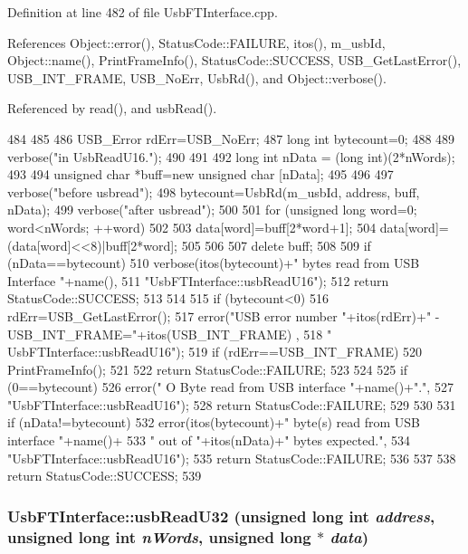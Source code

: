 Definition at line 482 of file UsbFTInterface.cpp.

References Object::error(), StatusCode::FAILURE, itos(), m\_\-usbId, Object::name(), PrintFrameInfo(), StatusCode::SUCCESS, USB\_\-GetLastError(), USB\_\-INT\_\-FRAME, USB\_\-NoErr, UsbRd(), and Object::verbose().

Referenced by read(), and usbRead().


\begin{DoxyCode}
484                                                                {
485   
486   USB_Error rdErr=USB_NoErr;
487   long int bytecount=0;
488 
489     verbose("in UsbReadU16.");
490 
491 
492   long int nData = (long int)(2*nWords);
493   
494   unsigned char *buff=new unsigned char [nData];
495 
496 
497     verbose("before usbread");  
498   bytecount=UsbRd(m_usbId, address, buff, nData);
499     verbose("after usbread");
500 
501   for (unsigned long word=0; word<nWords; ++word)
502   {
503     data[word]=buff[2*word+1];
504     data[word]=(data[word]<<8)|buff[2*word];
505   }
506 
507   delete buff;
508 
509   if (nData==bytecount){
510     verbose(itos(bytecount)+" bytes read from USB Interface "+name(),
511             "UsbFTInterface::usbReadU16");
512     return StatusCode::SUCCESS;
513   }
514 
515   if (bytecount<0){
516     rdErr=USB_GetLastError();
517     error("USB error number "+itos(rdErr)+" - USB_INT_FRAME="+itos(USB_INT_FRAME)
      ,
518             " UsbFTInterface::usbReadU16");
519     if (rdErr==USB_INT_FRAME){
520       PrintFrameInfo();
521     } 
522     return StatusCode::FAILURE;
523   }
524   
525   if (0==bytecount){
526     error(" O Byte read from USB interface "+name()+".",
527       "UsbFTInterface::usbReadU16");
528     return StatusCode::FAILURE;
529   }
530 
531   if (nData!=bytecount){
532     error(itos(bytecount)+" byte(s) read from USB interface "+name()+
533             " out of "+itos(nData)+" bytes expected.",
534       "UsbFTInterface::usbReadU16");
535     return StatusCode::FAILURE;    
536   }
537 
538   return StatusCode::SUCCESS;
539 }
\end{DoxyCode}
\hypertarget{classUsbFTInterface_a7eadb8a94323fada4c72ed1c992792cc}{
\subsubsection[{usbReadU32}]{ UsbFTInterface::usbReadU32 (unsigned long int {\em address}, \/  unsigned long int {\em nWords}, \/  unsigned long $\ast$ {\em data})}}
\label{classUsbFTInterface_a7eadb8a94323fada4c72ed1c992792cc}


